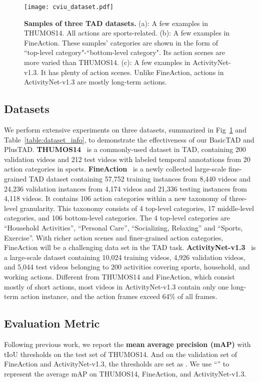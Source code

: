 \documentclass[a4paper,fleqn]{cas-dc}
\begin{document}
\begin{figure}[!t]
  \texttt{[image: cviu\_dataset.pdf]}
  \caption{
\textbf{Samples of three TAD datasets.} (a): A few examples in THUMOS14. All actions are sports-related. (b): A few examples in FineAction. These samples' categories are shown in the form of ``top-level category"-``bottom-level category". Its action scenes are more varied than THUMOS14. (c): A few examples in ActivityNet-v1.3. It has plenty of action scenes. Unlike FineAction, actions in ActivityNet-v1.3 are mostly long-term actions.
}
  \label{fig:cviu_dataset}
\end{figure}

\subsection{Datasets}
We perform extensive experiments on three datasets, summarized in Fig~\ref{fig:cviu_dataset} and Table~\ref{table:dataset_info}, to demonstrate the effectiveness of our BasicTAD and PlusTAD. 
\textbf{THUMOS14}~\citep{THUMOS14} is a commonly-used dataset in TAD, containing 200 validation videos and 212 test videos with labeled temporal annotations from 20 action categories in sports. 
\textbf{FineAction}~\citep{fineaction} is a newly collected large-scale fine-grained TAD dataset containing 57,752 training instances from 8,440 videos and 24,236 validation instances from 4,174 videos and 21,336 testing instances from 4,118 videos. It contains 106 action categories within a new taxonomy of three-level granularity. This taxonomy consists of 4 top-level categories, 17 middle-level categories, and 106 bottom-level categories. The 4 top-level categories are ``Household Activities'', ``Personal Care'', ``Socializing, Relaxing'' and ``Sports, Exercise''. With richer action scenes and finer-grained action categories, FineAction will be a challenging data set in the TAD task.
\textbf{ActivityNet-v1.3}~\citep{anet} is a large-scale dataset containing 10,024 training videos, 4,926 validation videos, and 5,044 test videos belonging to 200 activities covering sports, household, and working actions. Different from THUMOS14 and FineAction, which consist mostly of short actions, most videos in ActivityNet-v1.3 contain only one long-term action instance, and the action frames exceed 64\% of all frames. 

\subsection{Evaluation Metric}
Following previous work, we report the \textbf{mean average precision (mAP)} with tIoU thresholds  on the test set of THUMOS14.
And on the validation set of FineAction and ActivityNet-v1.3, the thresholds are set as .
We use ``'' to represent the average mAP on THUMOS14, FineAction, and ActivityNet-v1.3.
\end{document}
